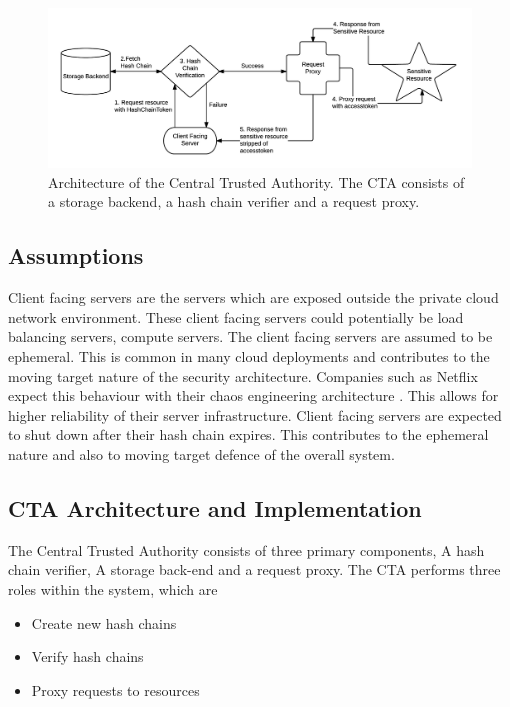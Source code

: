 \documentclass[a4paper,twoside]{article}
\begin{document}
\begin{figure}[!ht]
  \centering
  \includegraphics[keepaspectratio=true,scale=0.75]{cta_architecture}
  \caption{Architecture of the Central Trusted Authority. The CTA consists of a storage backend, a hash chain verifier and a request proxy.}
  \label{fig:ctaarchitecture}
\end{figure}

 \subsection{Assumptions}


Client facing servers are the servers which are exposed outside the private cloud network environment. These client facing servers could potentially be load balancing servers, compute servers.
%
The client facing servers are assumed to be ephemeral. This is common in many cloud deployments \cite{vaquero_dynamically_2011} and contributes to the moving target nature of the security architecture. Companies such as Netflix expect this behaviour with their chaos engineering architecture \cite{basiri_chaos_2016}. This allows for higher reliability of their server infrastructure.
%
Client facing servers are expected to shut down after their hash chain expires. This contributes to the ephemeral nature and also to moving target defence of the overall system.


\subsection{CTA Architecture and Implementation} \label{sec:cta-architecture}

The Central Trusted Authority consists of three primary components, A hash chain verifier, A storage back-end and a request proxy. The CTA performs three roles within the system, which are

\begin{itemize}
\item Create new hash chains
\item Verify hash chains
\item Proxy requests to resources
\end{itemize}
\end{document}
